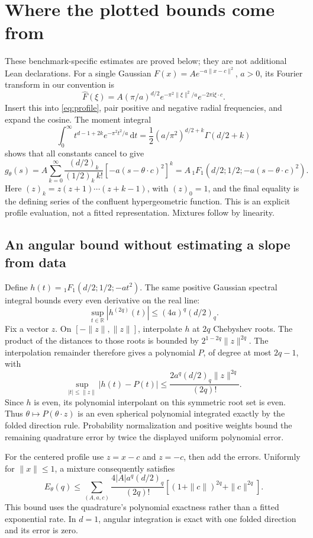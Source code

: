 \documentclass[11pt,letterpaper]{article}
\newcommand{\R}{\mathbb R}
\newcommand{\dd}{\,\mathrm d}
\newcommand{\ii}{\mathrm i}
\theoremstyle{definition}
\theoremstyle{remark}
\begin{document}
\section{Where the plotted bounds come from}\label{app:empirical-bounds}
These benchmark-specific estimates are proved below; they are not additional
Lean declarations.
For a single Gaussian \(F(x)=A e^{-a\|x-c\|^2}\), \(a>0\), its Fourier
transform in our convention is
\[
 \widehat F(\xi)=A(\pi/a)^{d/2}
      e^{-\pi^2\|\xi\|^2/a}e^{-2\pi\ii\xi\cdot c}.
\]
Insert this into \eqref{eq:profile}, pair positive and negative radial
frequencies, and expand the cosine. The moment integral
\[
 \int_0^\infty t^{d-1+2k}e^{-\pi^2t^2/a}\dd t
 =\frac12(a/\pi^2)^{d/2+k}\Gamma(d/2+k)
\]
shows that all constants cancel to give
\begin{equation}\label{eq:gaussian-profile}
 g_\theta(s)=A\sum_{k=0}^\infty
 \frac{(d/2)_k}{(1/2)_k\,k!}
       [-a(s-\theta\cdot c)^2]^k
 =A\,{}_1F_1(d/2;1/2;-a(s-\theta\cdot c)^2).
\end{equation}
Here \((z)_k=z(z+1)\cdots(z+k-1)\), with \((z)_0=1\), and the final equality
is the defining series of the confluent hypergeometric function. This is
an explicit profile evaluation, not a fitted representation. Mixtures follow
by linearity.

\subsection{An angular bound without estimating a slope from data}
Define \(h(t)={}_1F_1(d/2;1/2;-at^2)\). The same positive Gaussian spectral
integral bounds every even derivative on the real line:
\[
 \sup_{t\in\R}|h^{(2q)}(t)|\le(4a)^q(d/2)_q.
\]
Fix a vector \(z\). On \([-\|z\|,\|z\|]\), interpolate \(h\) at \(2q\)
Chebyshev roots. The product of the distances to those roots is bounded by
\(2^{1-2q}\|z\|^{2q}\). The interpolation remainder therefore gives a
polynomial \(P\), of degree at most \(2q-1\), with
\[
 \sup_{|t|\le\|z\|}|h(t)-P(t)|
 \le\frac{2a^q(d/2)_q\|z\|^{2q}}{(2q)!}.
\]
Since \(h\) is even, its polynomial interpolant on this symmetric root set
is even. Thus \(\theta\mapsto P(\theta\cdot z)\) is an even spherical
polynomial integrated exactly by the folded direction rule. Probability
normalization and positive weights bound the remaining quadrature error by
twice the displayed uniform polynomial error.

For the centered profile use \(z=x-c\) and \(z=-c\), then add the errors.
Uniformly for \(\|x\|\le1\), a mixture consequently satisfies
\begin{equation}\label{eq:benchmark-angular}
 E_\theta(q)\le
 \sum_{(A,a,c)}\frac{4|A|a^q(d/2)_q}{(2q)!}
       \left[(1+\|c\|)^{2q}+\|c\|^{2q}\right].
\end{equation}
This bound uses the quadrature's polynomial exactness rather than a fitted
exponential rate. In \(d=1\), angular integration is exact with one folded
direction and its error is zero.
\end{document}
